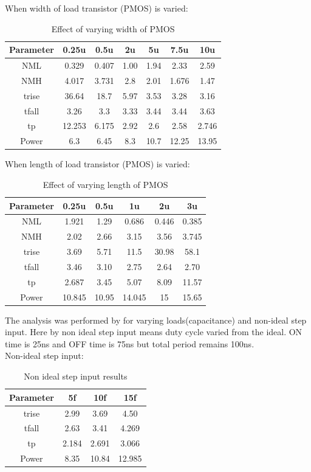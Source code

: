 \documentclass[12pt,a4paper]{article}
\begin{document}
When width of load transistor (PMOS) is varied:
\begin{table}[H]
\centering
\begin{tabular}{||c c c c c c c||} 
 \hline
 Parameter & 0.25u & 0.5u & 2u & 5u & 7.5u & 10u\\ [0.5ex] 
 \hline\hline
 NML & 0.329 & 0.407 & 1.00 & 1.94 & 2.33 & 2.59\\ 
 NMH & 4.017 & 3.731 & 2.8 & 2.01 & 1.676 & 1.47\\
 trise & 36.64 & 18.7 & 5.97 & 3.53 & 3.28 & 3.16\\
 tfall & 3.26 & 3.3 & 3.33 & 3.44 & 3.44 & 3.63\\
 tp & 12.253 & 6.175 & 2.92 & 2.6 & 2.58 & 2.746\\
 Power & 6.3 & 6.45 & 8.3 & 10.7 & 12.25 & 13.95\\
 [0.5ex] 
 \hline
\end{tabular}
\caption{Effect of varying width of PMOS}
\label{table:1}
\end{table}

When length of load transistor (PMOS) is varied:
\begin{table}[H]
\centering
\begin{tabular}{||c c c c c c||} 
 \hline
 Parameter & 0.25u & 0.5u & 1u & 2u & 3u \\ [0.5ex] 
 \hline\hline
 NML & 1.921 & 1.29 & 0.686 & 0.446 & 0.385\\ 
 NMH & 2.02 & 2.66 & 3.15 & 3.56 & 3.745\\
 trise & 3.69 & 5.71 & 11.5 & 30.98 & 58.1\\
 tfall & 3.46 & 3.10 & 2.75 & 2.64 & 2.70\\
 tp & 2.687 & 3.45 & 5.07 & 8.09 & 11.57\\
 Power & 10.845 & 10.95 & 14.045 & 15 & 15.65\\
 [0.5ex] 
 \hline
\end{tabular}
\caption{Effect of varying length of PMOS}
\label{table:1}
\end{table}

The analysis was performed by for varying loads(capacitance) and non-ideal step input. Here by non ideal step input means duty cycle varied from the ideal. ON time is 25ns and OFF time is 75ns but total period remains 100ns.\\

\newpage
Non-ideal step input:
\begin{table}[H]
\centering
\begin{tabular}{||c c c c||}
 \hline
 Parameter & 5f & 10f & 15f\\ [0.5ex] 
 \hline\hline
 trise & 2.99 & 3.69 & 4.50\\ 
 tfall & 2.63 & 3.41 & 4.269\\
 tp & 2.184 & 2.691 & 3.066\\
 Power & 8.35 & 10.84 & 12.985\\
 [0.5ex] 
 \hline
\end{tabular}
\caption{Non ideal step input results}
\label{table:1}
\end{table}
\end{document}
